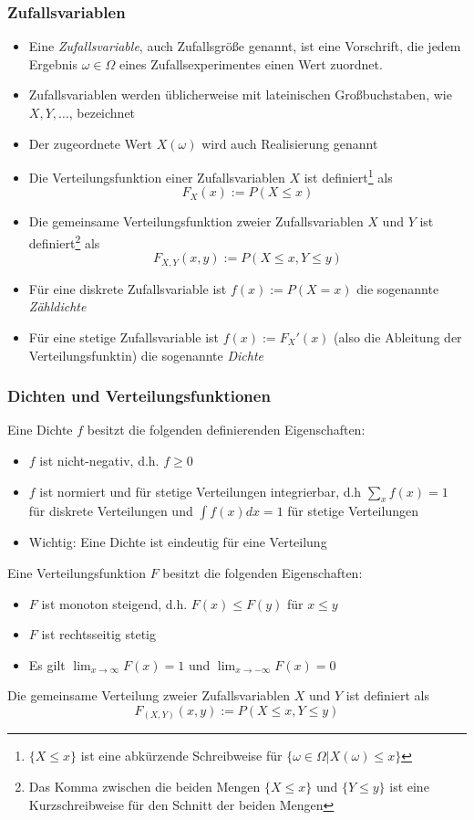 \begin{frame}
\frametitle{Zufallsvariablen}
\begin{itemize}[<+->]
\item Eine \textit{Zufallsvariable}, auch Zufallsgröße genannt, ist eine Vorschrift, die jedem Ergebnis $\omega \in \Omega$  eines Zufallsexperimentes einen Wert zuordnet. 
\item Zufallsvariablen werden üblicherweise mit lateinischen Großbuchstaben, wie $X,Y,\ldots$, bezeichnet
\item Der zugeordnete Wert $X(\omega)$ wird auch Realisierung genannt
\item Die Verteilungsfunktion einer Zufallsvariablen $X$ ist definiert\footnote{$\lbrace X \leq x \rbrace$ ist eine abkürzende Schreibweise für $\lbrace \omega\in\Omega \vert X(\omega) \leq x \rbrace$} als \[F_X(x) := P(X\leq x)\]
\item Die gemeinsame Verteilungsfunktion zweier Zufallsvariablen $X$ und $Y$ ist definiert\footnote{Das Komma zwischen die beiden Mengen $\lbrace X\leq x\rbrace$ und $\lbrace Y \leq y \rbrace$ ist eine Kurzschreibweise für den Schnitt der beiden Mengen} als \[F_{X,Y}(x,y) := P(X\leq x, Y\leq y)\] 
\item Für eine diskrete Zufallsvariable ist $f(x) := P(X=x)$ die sogenannte \textit{Zähldichte}
\item Für eine stetige Zufallsvariable ist $f(x) := F_X'(x)$ (also die Ableitung der Verteilungsfunktin) die sogenannte \textit{Dichte}
\end{itemize}
\end{frame}
\begin{frame}
\frametitle{Dichten und Verteilungsfunktionen}
Eine Dichte $f$ besitzt die folgenden definierenden Eigenschaften:
\begin{itemize}[<+->]
\item $f$ ist nicht-negativ, d.h. $f \geq 0$
\item $f$ ist normiert und für stetige Verteilungen integrierbar, d.h $\sum_x f(x) = 1$ für diskrete Verteilungen und $\int f(x) dx = 1$ für stetige Verteilungen
\item Wichtig: Eine Dichte ist eindeutig für eine Verteilung
\end{itemize}
Eine Verteilungsfunktion $F$ besitzt die folgenden Eigenschaften:
\begin{itemize}[<+->]
\item $F$ ist monoton steigend, d.h. $F(x) \leq F(y)$ für $x\leq y$
\item $F$ ist rechtsseitig stetig
\item Es gilt $\lim_{x\rightarrow \infty} F(x) = 1$ und $\lim_{x\rightarrow -\infty} F(x) = 0$
\end{itemize}
Die gemeinsame Verteilung zweier Zufallsvariablen $X$ und $Y$ ist definiert als
\[ F_{(X,Y)}(x,y) := P(X\leq x, Y\leq y) \]
\end{frame}
